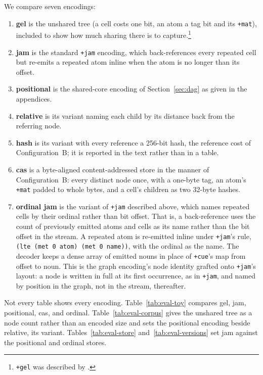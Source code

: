 \documentclass[twoside]{article}
\begin{document}
We compare seven encodings:
\begin{enumerate}
  \item  \textbf{gel} is the unshared tree (a cell costs one bit, an atom a tag bit and its \texttt{+mat}), included to show how much sharing there is to capture.\footnote{\texttt{+gel} was described by \citet{ticlys2026noun}.}
  \item  \textbf{jam} is the standard \texttt{+jam} encoding, which back-references every repeated cell but re-emits a repeated atom inline when the atom is no longer than its offset.
  \item  \textbf{positional} is the shared-core encoding of Section~\ref{sec:dag} as given in the appendices.
  \item  \textbf{relative} is its variant naming each child by its distance back from the referring node.
  \item  \textbf{hash} is its variant with every reference a 256-bit hash, the reference cost of Configuration~B; it is reported in the text rather than in a table.
  \item  \textbf{cas} is a byte-aligned content-addressed store in the manner of Configuration~B:  every distinct node once, with a one-byte tag, an atom's \texttt{+mat} padded to whole bytes, and a cell's children as two 32-byte hashes.
  \item  \textbf{ordinal jam} is the variant of \texttt{+jam} described above, which names repeated cells by their ordinal rather than bit offset.  That is, a back-reference uses the count of previously emitted atoms and cells as its name rather than the bit offset in the stream.  A repeated atom is re-emitted inline under \texttt{+jam}'s rule, \lstinline[style=inlinecode]{(lte (met 0 atom) (met 0 name))}, with the ordinal as the name.  The decoder keeps a dense array of emitted nouns in place of \texttt{+cue}'s map from offset to noun.  This is the graph encoding's node identity grafted onto \texttt{+jam}'s layout:  a node is written in full at its first occurrence, as in \texttt{+jam}, and named by position in the graph, not in the stream, thereafter.
\end{enumerate}

Not every table shows every encoding.  Table~\ref{tab:eval-toy} compares gel, jam, positional, cas, and ordinal.  Table~\ref{tab:eval-corpus} gives the unshared tree as a node count rather than an encoded size and sets the positional encoding beside relative, its variant.  Tables~\ref{tab:eval-store} and~\ref{tab:eval-versions} set jam against the positional and ordinal stores.
\end{document}
